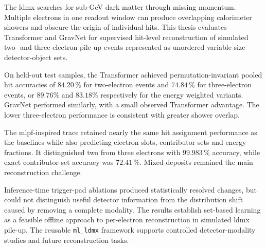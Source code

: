 \noindent

The \gls{ldmx} searches for sub-GeV dark matter through missing momentum.
Multiple electrons in one readout window can produce overlapping calorimeter
showers and obscure the origin of individual hits. This thesis evaluates
Transformer and GravNet for supervised hit-level reconstruction of simulated two- and three-electron
pile-up events represented as unordered variable-size detector-object sets.

On held-out test samples, the Transformer achieved permutation-invariant pooled
hit accuracies of \(84.20\,\%\) for two-electron events and \(74.84\,\%\)
for three-electron events, or $89.76\%$ and $83.18\%$ respectively for the energy weighted variants. GravNet performed similarly, with a small observed
Transformer advantage. The lower three-electron performance
is consistent with greater shower overlap.

The \gls{mlpf}-inspired \gls{trace} retained nearly the same
hit assignment performance as the baselines while also predicting electron slots,
contributor sets and energy fractions. It distinguished two from three
electrons with \(99.983\,\%\) accuracy, while exact contributor-set accuracy
was \(72.41\,\%\). Mixed deposits remained the main reconstruction challenge.

Inference-time trigger-pad ablations produced statistically resolved changes,
but could not distinguish useful detector information from the distribution
shift caused by removing a complete modality. The results establish set-based
learning as a feasible offline approach to per-electron reconstruction in
simulated \gls{ldmx} pile-up. The reusable \texttt{ml\_ldmx} framework
supports controlled detector-modality studies and future reconstruction tasks.









